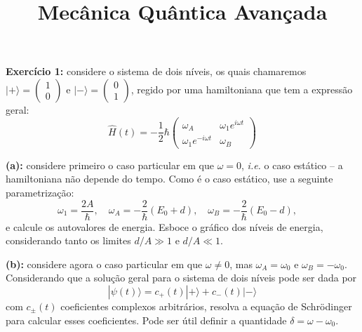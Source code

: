 \documentclass[12pt]{article}
\title{Mecânica Quântica Avançada}
\date{}
\begin{document}
\maketitle
\vspace*{-4em}

\textbf{Exercício 1:} considere o sistema de dois níveis, os quais chamaremos\\ 
$|+\rangle = \begin{pmatrix}1\\0\end{pmatrix}$ e $|-\rangle = \begin{pmatrix}0\\1\end{pmatrix}$, regido por uma hamiltoniana que tem a expressão geral:
%
\[
\hat{H}(t) = -\frac{1}{2} \hbar\left(\begin{array}{cc}\omega_{A} & \omega_{1} e^{i \omega t} \\ \omega_{1} e^{-i \omega t} & \omega_{B}\end{array}\right)
\]

\textbf{(a):} considere primeiro o caso particular em que $\omega = 0$, \textit{i.e.} o caso estático -- a hamiltoniana não depende do tempo.
Como é o caso estático, use a seguinte parametrização:
\[
\omega_1 = \frac{2A}{\hbar},\quad
\omega_A = -\frac{2}{\hbar}(E_0 + d),\quad
\omega_B = -\frac{2}{\hbar}(E_0 - d),\quad
\]
e calcule os autovalores de energia.
Esboce o gráfico dos níveis de energia, considerando tanto os limites $d/A \gg 1$ e $d/A \ll 1$.

\textbf{(b):} considere agora o caso particular em que $\omega \neq 0$, mas $\omega_A = \omega_0$ e $\omega_B = -\omega_0$.
Considerando que a solução geral para o sistema de dois níveis pode ser dada por
\[
|\psi(t)\rangle = c_+(t)|+\rangle + c_-(t)|-\rangle
\]
com $c_\pm(t)$ coeficientes complexos arbitrários,
resolva a equação de Schrödinger para calcular esses coeficientes.
Pode ser útil definir a quantidade $\delta = \omega - \omega_0$.
\end{document}
